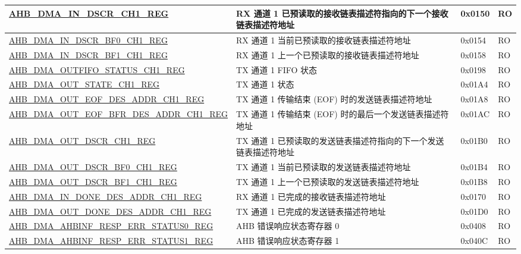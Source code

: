 \begin{longtable}{ | p{8cm} | p{8cm} | p{1.3cm} | p{1.5cm} | }
\hyperref[regdesc:AHBDMAINDSCRCHNREG]{AHB\_DMA\_IN\_DSCR\_CH1\_REG} & RX 通道 1 已预读取的接收链表描述符指向的下一个接收链表描述符地址 & 0x0150 & RO \\ \hline
\hyperref[regdesc:AHBDMAINDSCRBF0CHNREG]{AHB\_DMA\_IN\_DSCR\_BF0\_CH1\_REG} & RX 通道 1 当前已预读取的接收链表描述符地址 & 0x0154 & RO \\ \hline
\hyperref[regdesc:AHBDMAINDSCRBF1CHNREG]{AHB\_DMA\_IN\_DSCR\_BF1\_CH1\_REG} & RX 通道 1 上一个已预读取的接收链表描述符地址 & 0x0158 & RO \\ \hline
\hyperref[regdesc:AHBDMAOUTFIFOSTATUSCHNREG]{AHB\_DMA\_OUTFIFO\_STATUS\_CH1\_REG} & TX 通道 1 FIFO 状态 & 0x0198 & RO \\ \hline
\hyperref[regdesc:AHBDMAOUTSTATECHNREG]{AHB\_DMA\_OUT\_STATE\_CH1\_REG} & TX 通道 1 状态 & 0x01A4 & RO \\ \hline
\hyperref[regdesc:AHBDMAOUTEOFDESADDRCHNREG]{AHB\_DMA\_OUT\_EOF\_DES\_ADDR\_CH1\_REG} & TX 通道 1 传输结束 (EOF) 时的发送链表描述符地址 & 0x01A8 & RO \\ \hline
\hyperref[regdesc:AHBDMAOUTEOFBFRDESADDRCHNREG]{AHB\_DMA\_OUT\_EOF\_BFR\_DES\_ADDR\_CH1\_REG} & TX 通道 1 传输结束 (EOF) 时的最后一个发送链表描述符地址 & 0x01AC & RO \\ \hline
\hyperref[regdesc:AHBDMAOUTDSCRCHNREG]{AHB\_DMA\_OUT\_DSCR\_CH1\_REG} & TX 通道 1 已预读取的发送链表描述符指向的下一个发送链表描述符地址 & 0x01B0 & RO \\ \hline
\hyperref[regdesc:AHBDMAOUTDSCRBF0CHNREG]{AHB\_DMA\_OUT\_DSCR\_BF0\_CH1\_REG} & TX 通道 1 当前已预读取的发送链表描述符地址 & 0x01B4 & RO \\ \hline
\hyperref[regdesc:AHBDMAOUTDSCRBF1CHNREG]{AHB\_DMA\_OUT\_DSCR\_BF1\_CH1\_REG} & TX 通道 1 上一个已预读取的发送链表描述符地址 & 0x01B8 & RO \\ \hline
\hyperref[regdesc:AHBDMAINDONEDESADDRCHNREG]{AHB\_DMA\_IN\_DONE\_DES\_ADDR\_CH1\_REG} & RX 通道 1 已完成的接收链表描述符地址 & 0x0170 & RO \\ \hline
\hyperref[regdesc:AHBDMAOUTDONEDESADDRCHNREG]{AHB\_DMA\_OUT\_DONE\_DES\_ADDR\_CH1\_REG} & TX 通道 1 已完成的发送链表描述符地址 & 0x01D0 & RO \\ \hline
\hyperref[regdesc:AHBDMAAHBINFRESPERRSTATUS0REG]{AHB\_DMA\_AHBINF\_RESP\_ERR\_STATUS0\_REG} & AHB 错误响应状态寄存器 0 & 0x0408 & RO \\ \hline
\hyperref[regdesc:AHBDMAAHBINFRESPERRSTATUS1REG]{AHB\_DMA\_AHBINF\_RESP\_ERR\_STATUS1\_REG} & AHB 错误响应状态寄存器 1 & 0x040C & RO \\ \hline

\end{longtable}
